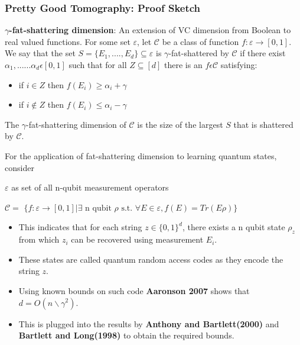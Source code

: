 \documentclass{beamer}
\begin{document}
    
    
    
    
    \begin{frame}
    \frametitle{Pretty Good Tomography: Proof Sketch}
    \textbf{$\gamma$-fat-shattering dimension}: An extension of VC dimension from Boolean to real valued functions. For some set $\varepsilon$, let $\mathcal{C}$ be a class of function $f: \varepsilon \rightarrow [0,1]$. We say that the set $S = \{E_1,....,E_d\} \subseteq \varepsilon$ is $\gamma$-fat-shattered by $\mathcal{C}$ if there exist $\alpha_1,......\alpha_d  \epsilon  [0,1]$ such that for all $Z \subseteq [d]$ there is an $f \epsilon \mathcal{C}$ satisfying:
    
    \begin{itemize}
    \item if $i \in Z$ then $f(E_i)\geq \alpha_i + \gamma$
    \item if $i \not\in Z$ then $f(E_i)\leq \alpha_i - \gamma$
    \end{itemize}
    
    The $\gamma$-fat-shattering dimension of $\mathcal{C}$ is the size of the largest $S$ that is shattered by $\mathcal{C}$. 
    \end{frame}
    
    For the application of fat-shattering dimension to learning quantum states, consider
    
    \begin{center}
    $\varepsilon$ as set of all n-qubit measurement operators
    
    $\mathcal{C} =$ $\{f : \varepsilon \rightarrow [0,1] | \exists \text{ n qubit } \rho \text{ s.t. } \forall E \in \varepsilon, f(E) = {Tr}(E\rho)\}$
    
    \end{center}
    
    \begin{itemize}
    
    \item This indicates that for each string $z \in \{0,1\}^d$, there exists a n qubit state $\rho_z$ from which $z_i$ can be recovered using measurement $E_i$.
    
    \item These states are called quantum random access codes as they encode the string $z$.
    
    \item Using known bounds on such code \textbf{Aaronson 2007} shows that $d = O(n \backslash\gamma^2)$.
    
    \item This is plugged into the results by \textbf{Anthony and Bartlett(2000)} and \textbf{Bartlett and Long(1998)} to obtain the required bounds.
    
    \end{itemize}
    
\end{document}
